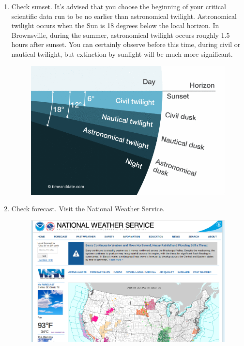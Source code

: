 \documentclass{article}
\begin{document}
			\begin{enumerate}
	
				\item Check sunset. It's advised that you choose the beginning of your critical scientific data run to be no earlier than astronomical twilight. Astronomical twilight occurs when the Sun is 18 degrees below the local horizon. In Brownsville, during the summer, astronomical twilight occurs roughly 1.5 hours after sunset. You can certainly observe before this time, during civil or nautical twilight, but extinction by sunlight will be much more significant.
			
				\begin{figure}[h]
					\centering
					\includegraphics[scale=0.5]{twilight-phases-dusk.png}
				\end{figure}
	
				\item Check forecast. Visit the \href{https://www.weather.gov}{National Weather Service}.
		
				\begin{figure}[h]
					\centering
					\includegraphics[scale=0.2]{nws.png}
				\end{figure}
			

\end{enumerate}
\end{document}
